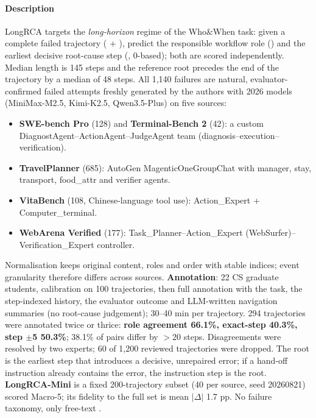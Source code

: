 \paragraph{Description} LongRCA targets the \emph{long-horizon} regime of the Who\&When task: given a complete failed trajectory ( + ), predict the responsible workflow role () and the earliest decisive root-cause step (, 0-based); both are scored independently. Median length is 145 steps and the reference root precedes the end of the trajectory by a median of 48 steps. All 1,140 failures are natural, evaluator-confirmed failed attempts freshly generated by the authors with 2026 models (MiniMax-M2.5, Kimi-K2.5, Qwen3.5-Plus) on five sources:
\begin{itemize}
\item \textbf{SWE-bench Pro} (128) and \textbf{Terminal-Bench 2} (42): a custom DiagnostAgent--ActionAgent--JudgeAgent team (diagnosis--execution--verification).
\item \textbf{TravelPlanner} (685): AutoGen MagenticOneGroupChat with manager, stay, transport, food\_attr and verifier agents.
\item \textbf{VitaBench} (108, Chinese-language tool use): Action\_Expert + Computer\_terminal.
\item \textbf{WebArena Verified} (177): Task\_Planner--Action\_Expert (WebSurfer)--Verification\_Expert controller.
\end{itemize}
Normalisation keeps original content, roles and order with stable indices; event granularity therefore differs across sources. \textbf{Annotation}: 22 CS graduate students, calibration on 100 trajectories, then full annotation with the task, the step-indexed history, the evaluator outcome and LLM-written navigation summaries (no root-cause judgement); 30--40 min per trajectory. 294 trajectories were annotated twice or thrice: \textbf{role agreement 66.1\%, exact-step 40.3\%, step $\pm$5 50.3\%}; 38.1\% of pairs differ by $>$20 steps. Disagreements were resolved by two experts; 60 of 1,200 reviewed trajectories were dropped. The root is the earliest step that introduces a decisive, unrepaired error; if a hand-off instruction already contains the error, the instruction step is the root. \textbf{LongRCA-Mini} is a fixed 200-trajectory subset (40 per source, seed 20260821) scored Macro-5; its fidelity to the full set is mean $|\Delta|$ 1.7 pp. No failure taxonomy, only free-text .

